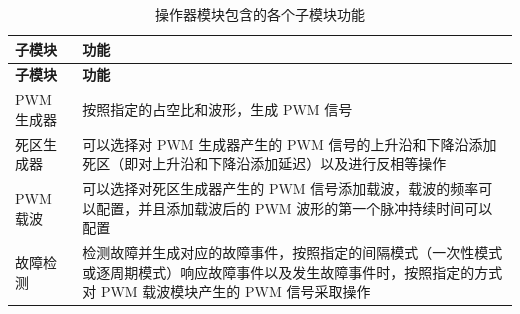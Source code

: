 \begin{longtable}[c]{|p{4cm}|p{11cm}|}
\caption{操作器模块包含的各个子模块功能}
\label{tab:mcpwm-param-operator}
    \\\hline
    \rowcolor{lightgray}
 \textbf{子模块} & \textbf{功能} \\ \hline 

\endfirsthead\hline
 \rowcolor{lightgray}
 \textbf{子模块} & \textbf{功能}\\
 \hline 
\endhead
\endfoot

PWM 生成器 & 按照指定的占空比和波形，生成 PWM 信号 \\\hline
     
死区生成器  & 可以选择对 PWM 生成器产生的 PWM 信号的上升沿和下降沿添加死区（即对上升沿和下降沿添加延迟）以及进行反相等操作 \\\hline
    
PWM 载波 & 可以选择对死区生成器产生的 PWM 信号添加载波，载波的频率可以配置，并且添加载波后的 PWM 波形的第一个脉冲持续时间可以配置 \\\hline
    
故障检测 & 检测故障并生成对应的故障事件，按照指定的间隔模式（一次性模式或逐周期模式）响应故障事件以及发生故障事件时，按照指定的方式对 PWM 载波模块产生的 PWM 信号采取操作 \\\hline
    
\end{longtable}

